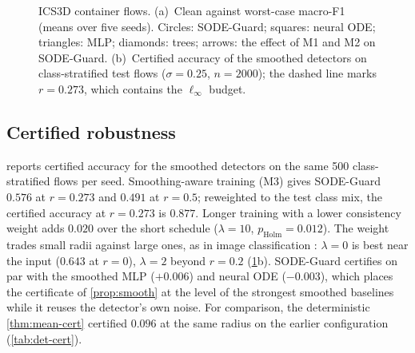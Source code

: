 \begin{figure}[t]
\caption{ICS3D container flows. (a)~Clean against worst-case macro-F1 (means over five seeds).
Circles: SODE-Guard; squares: neural ODE; triangles: MLP; diamonds: trees;
arrows: the effect of M1 and M2 on SODE-Guard. (b)~Certified accuracy of the
smoothed detectors on class-stratified test flows ($\sigma=0.25$, $n=2000$);
the dashed line marks $r=0.273$, which contains the $\ell_\infty$ budget.}
\label{fig:results}
\end{figure}

\subsection{Certified robustness}
 reports certified accuracy for the smoothed detectors on the same
500 class-stratified flows per seed. Smoothing-aware training (M3) gives
SODE-Guard $0.576$ at $r=0.273$ and $0.491$ at $r=0.5$; reweighted to the test
class mix, the certified accuracy at $r=0.273$ is $0.877$. Longer training with a
lower consistency weight adds $0.020$ over the short schedule ($\lambda=10$,
$p_{\mathrm{Holm}}=0.012$). The
weight trades small radii against large ones, as in image classification
\citep{jeong2020consistency}: $\lambda=0$ is best near the input ($0.643$ at
$r=0$), $\lambda=2$ beyond $r=0.2$ (\cref{fig:results}b). SODE-Guard certifies
on par with the smoothed MLP ($+0.006$) and neural ODE ($-0.003$), which places
the certificate of \cref{prop:smooth} at the level of the strongest smoothed
baselines while it reuses the detector's own noise. For comparison, the
deterministic \cref{thm:mean-cert} certified $0.096$ at the same radius on the
earlier configuration (\cref{tab:det-cert}).

